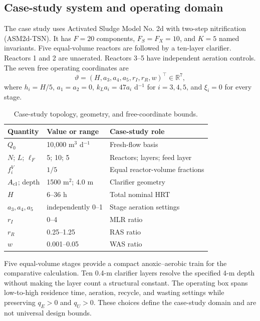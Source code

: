 \documentclass[a4paper,fleqn]{cas-sc}
\newcommand{\R}{\mathbb{R}}
\begin{document}
\subsection{Case-study system and operating domain}

The case study uses Activated Sludge Model No. 2d with two-step nitrification (ASM2d-TSN). It has $F=20$ components, $F_S=F_X=10$, and $K=5$ named invariants. Five equal-volume reactors are followed by a ten-layer clarifier. Reactors 1 and 2 are unaerated. Reactors 3--5 have independent aeration controls. The seven free operating coordinates are
\begin{equation}
\vartheta=(H,a_3,a_4,a_5,r_I,r_R,w)^\top\in\R^7,
\label{eq:casecontrols}
\end{equation}
where $h_i=H/5$, $a_1=a_2=0$, $k_La_i=47a_i$ d$^{-1}$ for $i=3,4,5$, and $\xi_i=0$ for every stage.

\begin{table}[pos=htbp]
\centering
\caption{Case-study topology, geometry, and free-coordinate bounds.}
\label{tab:domain}
\small
\begin{tabular}{lll}
\toprule
Quantity & Value or range & Case-study role\\
\midrule
$Q_0$ & 10,000 m$^3$ d$^{-1}$ & Fresh-flow basis\\
$N$; $L$; $\ell_F$ & 5; 10; 5 & Reactors; layers; feed layer\\
$f_i^V$ & $1/5$ & Equal reactor-volume fractions\\
$A_{\rm cl}$; depth & 1500 m$^2$; 4.0 m & Clarifier geometry\\
$H$ & 6--36 h & Total nominal HRT\\
$a_3,a_4,a_5$ & independently 0--1 & Stage aeration settings\\
$r_I$ & 0--4 & MLR ratio\\
$r_R$ & 0.25--1.25 & RAS ratio\\
$w$ & 0.001--0.05 & WAS ratio\\
\bottomrule
\end{tabular}
\end{table}

Five equal-volume stages provide a compact anoxic--aerobic train for the comparative calculation. Ten 0.4-m clarifier layers resolve the specified 4-m depth without making the layer count a structural constant. The operating box spans low-to-high residence time, aeration, recycle, and wasting settings while preserving $q_E>0$ and $q_U>0$. These choices define the case-study domain and are not universal design bounds.
\end{document}
